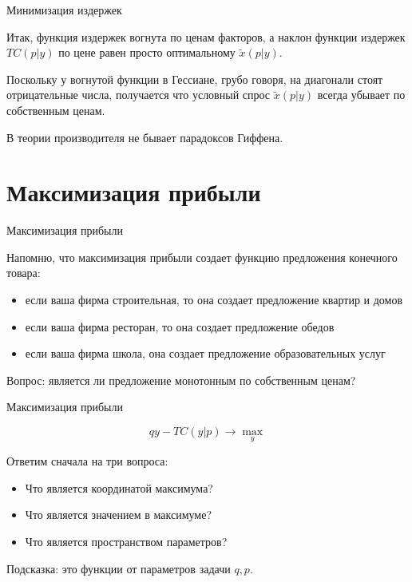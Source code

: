 \documentclass{beamer}
\begin{document}
\begin{frame}{Минимизация издержек}

Итак, функция издержек вогнута по ценам факторов, а наклон функции издержек $TC(p|y)$ по цене равен просто оптимальному $\tilde x(p|y)$.

Поскольку у вогнутой функции в Гессиане, грубо говоря, на диагонали стоят отрицательные числа, получается что условный спрос $\tilde x(p|y)$ всегда убывает по собственным ценам.

\alert{В теории производителя не бывает парадоксов Гиффена}.

\end{frame}

\section{Максимизация прибыли}

\begin{frame}{Максимизация прибыли}

Напомню, что максимизация прибыли создает функцию предложения конечного товара:

\begin{itemize}
  \item если ваша фирма строительная, то она создает предложение квартир и домов
  \item если ваша фирма ресторан, то она создает предложение обедов
  \item если ваша фирма школа, она создает предложение образовательных услуг
\end{itemize}

Вопрос: является ли предложение монотонным по собственным ценам?
\end{frame}

\begin{frame}{Максимизация прибыли}

$$ q y - TC(y| p) \to \max_y$$

Ответим сначала на три вопроса:

\begin{itemize}
  \item Что является координатой максимума?
  \item Что является значением в максимуме?
  \item Что является пространством параметров?
\end{itemize}

Подсказка: это функции от параметров задачи $q, p$.

\end{frame}
\end{document}
